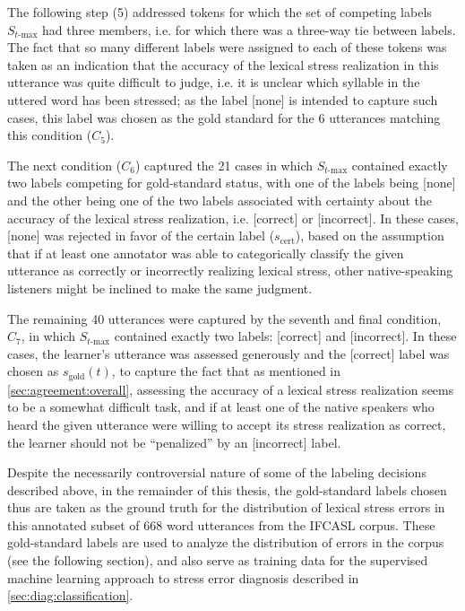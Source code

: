 		The following step (5) addressed tokens for which the set of competing labels $S_{t\text{-max}}$ had three members, i.e. for which there was a three-way tie between labels. The fact that so many different labels were assigned to each of these tokens was taken as an indication that the accuracy of the lexical stress realization in this utterance was quite difficult to judge, i.e. it is unclear which syllable in the uttered word has been stressed; as the label [none] is intended to capture such cases, this label was chosen as the gold standard for the 6 utterances matching this condition ($C_5$).
		
		The next condition ($C_6$) captured the 21 cases in which $S_{t\text{-max}}$ contained exactly two labels competing for gold-standard status, with one of the labels being [none] and the other being one of the two labels associated with certainty about the accuracy of the lexical stress realization, i.e. [correct] or [incorrect]. In these cases, [none] was rejected in favor of the certain label ($s_{\text{cert}}$), based on the assumption that if at least one annotator was able to categorically classify the given utterance as correctly or incorrectly realizing lexical stress, other native-speaking listeners might be inclined to make the same judgment. %
		
		The remaining 40 utterances were captured by the seventh and final condition, $C_7$, in which $S_{t\text{-max}}$ contained exactly two labels: [correct] and [incorrect]. In these cases, the learner's utterance was assessed generously and the [correct] label was chosen as $s_{\text{gold}}(t)$, to capture the fact that as mentioned in \cref{sec:agreement:overall}, assessing the accuracy of a lexical stress realization seems to be a somewhat difficult task, and if at least one of the native speakers who heard the given utterance were willing to accept its stress realization as correct, the learner should not be ``penalized'' by an [incorrect] label.
		
		Despite the necessarily controversial nature of some of the labeling decisions described above, in the remainder of this thesis, the gold-standard labels chosen thus are taken as the ground truth for the distribution of lexical stress errors in this annotated subset of  668 word utterances from the IFCASL corpus. These gold-standard labels are used to analyze the distribution of errors in the corpus (see the following section), and also serve as training data for the supervised machine learning approach to stress error diagnosis described in  \cref{sec:diag:classification}. 
		
